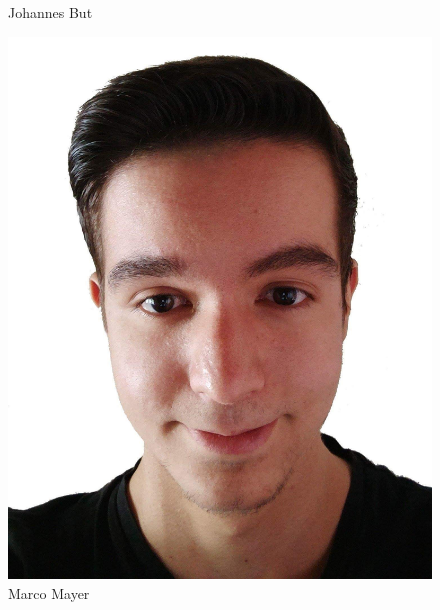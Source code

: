 \begin{figure}[htb]
\begin{minipage}{0.45\linewidth}
		\caption{Johannes But}
		\vspace{30pt}
	\end{minipage}
	\begin{minipage}{0.45\linewidth}
		\centering
		\includegraphics[scale=0.058]{content/pictures/Marco.jpeg}
		\caption{Marco Mayer}
		\vspace{30pt}
	\end{minipage}
	\begin{minipage}{0.45\linewidth}
		\centering

\end{minipage}
\end{figure}
